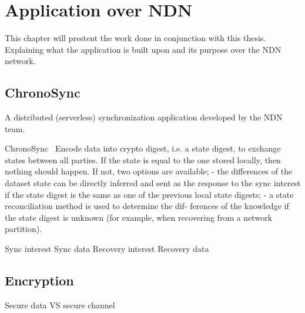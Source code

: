 \chapter{Application over \gls{NDN}}\label{chp3:application}
This chapter will prestent the work done in conjunction with this thesis. 
Explaining what the application is built upon and its purpose over the \gls{NDN} network. 

\section{ChronoSync}
A distributed (serverless) synchronization application developed by the \gls{NDN} team. 

ChronoSync~\cite{DBLP:conf/icnp/ZhuA13}
Encode data into crypto digest, i.e. a state digest, to exchange states between all parties. 
If the state is equal to the one stored locally, then nothing should happen.
If not, two options are available; 
- the differences of the dataset state can be directly inferred
and sent as the response to the sync interest if the state
digest is the same as one of the previous local state
digests;
- a state reconciliation method is used to determine the dif-
ferences of the knowledge if the state digest is unknown
(for example, when recovering from a network partition).

Sync interest
Sync data
Recovery interest
Recovery data


\section{Encryption}
Secure data VS secure channel